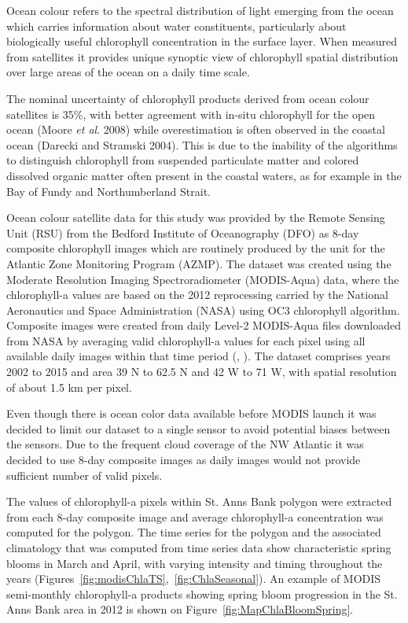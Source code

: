 \documentclass[letterpaper,portrait,11pt]{scrartcl}
\numberwithin{equation}{section}		%
\numberwithin{figure}{section}		%
\numberwithin{table}{section}				%
\begin{document}
Ocean colour refers to the spectral distribution of light emerging from the ocean which carries information about water constituents, particularly about biologically useful chlorophyll concentration in the surface layer. When measured from satellites it provides unique synoptic view of chlorophyll spatial distribution over large areas of the ocean on a daily time scale.

The nominal uncertainty of chlorophyll products derived from ocean colour satellites is 35\%, with better agreement with in-situ chlorophyll for the open ocean (Moore \textit{et al}. 2008) while overestimation is often observed in the coastal ocean (Darecki and Stramski 2004). This is due to the inability of the algorithms to distinguish chlorophyll from suspended particulate matter and colored dissolved organic matter often present in the coastal waters, as for example in the Bay of Fundy and Northumberland Strait.

Ocean colour satellite data for this study was provided by the Remote Sensing Unit (RSU) from the Bedford Institute of Oceanography (DFO) as 8-day composite chlorophyll images which are routinely produced by the unit for the Atlantic Zone Monitoring Program (AZMP). The dataset was created using the Moderate Resolution Imaging Spectroradiometer (MODIS-Aqua) data, where the chlorophyll-a values are based on the 2012 reprocessing carried by the National Aeronautics and Space Administration (NASA) using OC3 chlorophyll algorithm. Composite images were created from daily Level-2 MODIS-Aqua files downloaded from NASA by averaging valid chlorophyll-a values for each pixel using all available daily images within that time period (\cite{Caverhill:2015:modis}, \cite{feldman:2015}). The dataset comprises years 2002 to 2015 and area 39 N to 62.5 N and 42 W to 71 W, with spatial resolution of about 1.5 km per pixel. 

Even though there is ocean color data available before MODIS launch it was decided to limit our dataset to a single sensor to avoid potential biases between the sensors. Due to the frequent cloud coverage of the NW Atlantic it was decided to use 8-day composite images as daily images would not provide sufficient number of valid pixels. 

The values of chlorophyll-a pixels within St. Anns Bank polygon were extracted from each 8-day composite image and average chlorophyll-a concentration was computed for the polygon. The time series for the polygon and the associated climatology that was computed from time series data show characteristic spring blooms in March and April, with varying intensity and timing throughout the years (Figures~\ref{fig:modisChlaTS},~\ref{fig:ChlaSeasonal}). An example of MODIS semi-monthly chlorophyll-a products showing spring bloom progression in the St. Anns Bank area in 2012 is shown on Figure~\ref{fig:MapChlaBloomSpring}.
\end{document}
